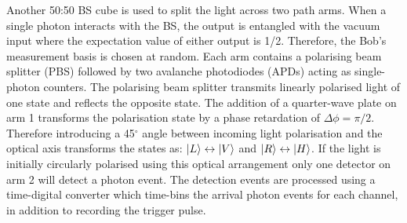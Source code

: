 Another 50:50 BS cube is used to split the light across two path arms. When a single photon interacts with the BS, the output is entangled with the vacuum input where the expectation value of either output is 1/2. Therefore, the Bob's measurement basis is chosen at random. Each arm contains a polarising beam splitter (PBS) followed by two avalanche photodiodes (APDs) acting as single-photon counters. The polarising beam splitter transmits linearly polarised light of one state and reflects the opposite state. The addition of a quarter-wave plate on arm 1 transforms the polarisation state by a phase retardation of $\Delta \phi = \pi/2$. Therefore introducing a 45$^{\circ}$ angle between incoming light polarisation and the optical axis transforms the states as: $\lvert L\rangle\leftrightarrow\lvert V\rangle$ and $\lvert R\rangle\leftrightarrow\lvert H\rangle$. If the light is initially circularly polarised using this optical arrangement only one detector on arm 2 will detect a photon event. The detection events are processed using a time-digital converter which time-bins the arrival photon events for each channel, in addition to recording the trigger pulse. 
